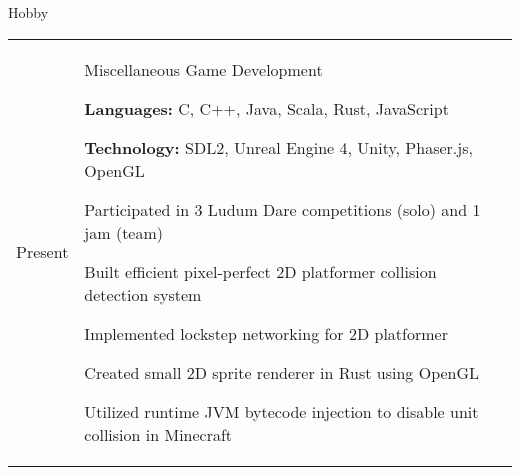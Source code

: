 \documentclass[12pt]{article}
\renewcommand{\section}[1]{{\Huge{#1}}\vspace{2 mm}}
\newenvironment{timeline}
        {\begin{tabular}{p{21 mm}|p{150 mm}}}
        {\end{tabular}}
\newenvironment{timelinetitle}
        {\vspace{-2 mm}\begin{large}}
        {\end{large}\vspace{-1.5 mm}}
\newcommand{\timespan}[2]{{#2}\newline{#1}}
\newcommand{\resumeitem}{\newline\vspace{3 mm}\hspace{3 mm}}
\newcommand{\resumestart}{\vspace{1 mm}}
\begin{document}
\vspace{5.0 mm}
\section{Hobby}
\hline

\begin{timeline}
\timespan{2011}{Present}
&
\begin{timelinetitle}
    Miscellaneous Game Development
\end{timelinetitle}
\resumestart

\resumeitem \textbf{Languages:} C, C++, Java, Scala, Rust, JavaScript

\resumeitem \textbf{Technology:} SDL2, Unreal Engine 4, Unity, Phaser.js, OpenGL

\resumeitem Participated in 3 Ludum Dare competitions (solo) and 1 jam (team)

\resumeitem Built efficient pixel-perfect 2D platformer collision detection system

\resumeitem Implemented lockstep networking for 2D platformer

\resumeitem Created small 2D sprite renderer in Rust using OpenGL

\resumeitem Utilized runtime JVM bytecode injection to disable unit collision in Minecraft

\end{timeline}
\end{document}
